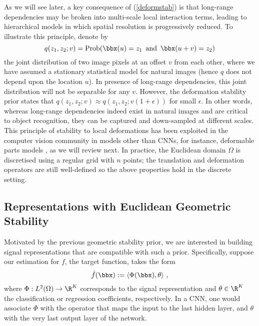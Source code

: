 As we will see later, a key consequence of (\ref{deformstab}) is that long-range dependencies may be broken into multi-scale 
local interaction terms, leading to hierarchical models in which spatial resolution is progressively reduced.
 To illustrate this principle,
denote by 
 \begin{equation}
q(z_1, z_2;v) = \mathrm{Prob}( \bbx(u) = z_1 \,\,\, \mathrm{and} \,\,\, \bbx(u+v)=z_2)
 \end{equation}
 the joint distribution of two image pixels at an offset $v$ from each other, where we have assumed a stationary statistical model for natural images (hence $q$ does not depend upon the location $u$).
 In presence of long-range dependencies, this joint distribution will not be separable for any $v$. However, the deformation stability prior states that $q(z_1, z_2; v) \approx q(z_1, z_2; v(1+\epsilon))$ for small $\epsilon$. In other words, whereas long-range dependencies indeed exist in natural images and are critical to object recognition, they can be captured and down-sampled at different scales.
This principle of stability to local deformations has been exploited in the computer vision community 
in models other than CNNs, for instance, deformable parts models \cite{felzenszwalb2010object}, as we will review next.
In practice, the Euclidean domain $\Omega$ is discretised using a regular grid with $n$ points; the translation and deformation operators are still well-defined so the above properties hold in the discrete setting. 

\subsection{Representations with Euclidean Geometric Stability}

Motivated by the previous geometric stability prior, we are 
interested in building signal representations that are compatible with such a prior. Specifically, suppose our estimation for $f$, the target function, takes the form 
\begin{equation}
    \hat{f}(\bbx) := \langle \Phi(\bbx), \theta \rangle~,
\end{equation}
where $\Phi: L^2(\Omega) \to \R^K$ corresponds to the signal representation and $\theta \in \R^K$ the classification or regression coefficients, respectively. 
In a CNN, one would associate $\Phi$ with the operator that maps the input to the last hidden layer, and $\theta$ with the very last output layer of the network. 

